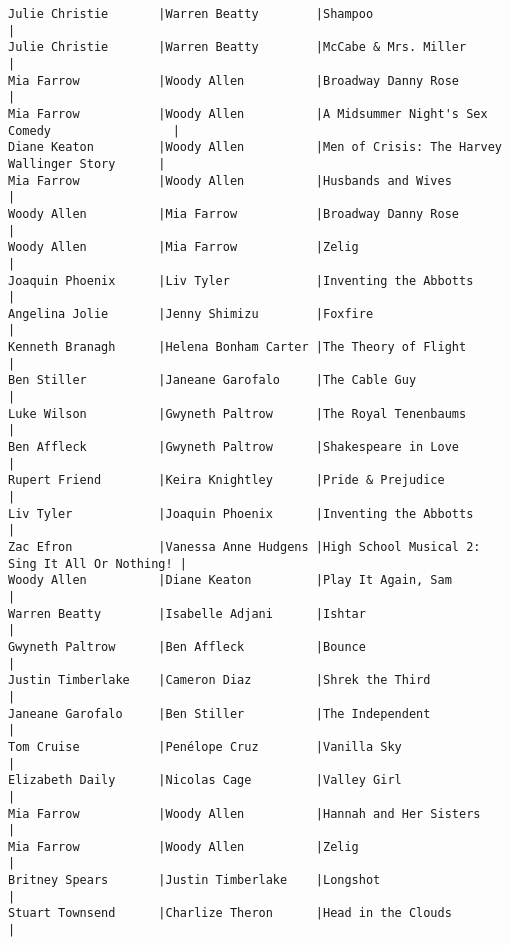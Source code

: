 \documentclass{article}
\begin{document}
\begin{verbatim}
Julie Christie       |Warren Beatty        |Shampoo                                        |
Julie Christie       |Warren Beatty        |McCabe & Mrs. Miller                           |
Mia Farrow           |Woody Allen          |Broadway Danny Rose                            |
Mia Farrow           |Woody Allen          |A Midsummer Night's Sex Comedy                 |
Diane Keaton         |Woody Allen          |Men of Crisis: The Harvey Wallinger Story      |
Mia Farrow           |Woody Allen          |Husbands and Wives                             |
Woody Allen          |Mia Farrow           |Broadway Danny Rose                            |
Woody Allen          |Mia Farrow           |Zelig                                          |
Joaquin Phoenix      |Liv Tyler            |Inventing the Abbotts                          |
Angelina Jolie       |Jenny Shimizu        |Foxfire                                        |
Kenneth Branagh      |Helena Bonham Carter |The Theory of Flight                           |
Ben Stiller          |Janeane Garofalo     |The Cable Guy                                  |
Luke Wilson          |Gwyneth Paltrow      |The Royal Tenenbaums                           |
Ben Affleck          |Gwyneth Paltrow      |Shakespeare in Love                            |
Rupert Friend        |Keira Knightley      |Pride & Prejudice                              |
Liv Tyler            |Joaquin Phoenix      |Inventing the Abbotts                          |
Zac Efron            |Vanessa Anne Hudgens |High School Musical 2: Sing It All Or Nothing! |
Woody Allen          |Diane Keaton         |Play It Again, Sam                             |
Warren Beatty        |Isabelle Adjani      |Ishtar                                         |
Gwyneth Paltrow      |Ben Affleck          |Bounce                                         |
Justin Timberlake    |Cameron Diaz         |Shrek the Third                                |
Janeane Garofalo     |Ben Stiller          |The Independent                                |
Tom Cruise           |Penélope Cruz        |Vanilla Sky                                    |
Elizabeth Daily      |Nicolas Cage         |Valley Girl                                    |
Mia Farrow           |Woody Allen          |Hannah and Her Sisters                         |
Mia Farrow           |Woody Allen          |Zelig                                          |
Britney Spears       |Justin Timberlake    |Longshot                                       |
Stuart Townsend      |Charlize Theron      |Head in the Clouds                             |

\end{verbatim}
\end{document}
